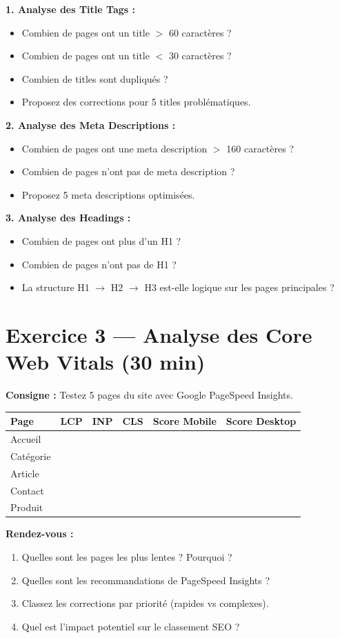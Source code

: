 \documentclass[12pt,a4paper]{report}
\begin{document}
\textbf{1. Analyse des Title Tags :}
\begin{itemize}
\item Combien de pages ont un title $>$ 60 caractères ?
\item Combien de pages ont un title $<$ 30 caractères ?
\item Combien de titles sont dupliqués ?
\item Proposez des corrections pour 5 titles problématiques.
\end{itemize}

\textbf{2. Analyse des Meta Descriptions :}
\begin{itemize}
\item Combien de pages ont une meta description $>$ 160 caractères ?
\item Combien de pages n'ont pas de meta description ?
\item Proposez 5 meta descriptions optimisées.
\end{itemize}

\textbf{3. Analyse des Headings :}
\begin{itemize}
\item Combien de pages ont plus d'un H1 ?
\item Combien de pages n'ont pas de H1 ?
\item La structure H1 $\rightarrow$ H2 $\rightarrow$ H3 est-elle logique sur les pages principales ?
\end{itemize}

\section{Exercice 3 --- Analyse des Core Web Vitals (30 min)}

\textbf{Consigne :} Testez 5 pages du site avec Google PageSpeed Insights.

\begin{tabular}{|l|c|c|c|c|c|}
\hline
\textbf{Page} & \textbf{LCP} & \textbf{INP} & \textbf{CLS} & \textbf{Score Mobile} & \textbf{Score Desktop} \\
\hline
Accueil & & & & & \\
\hline
Catégorie & & & & & \\
\hline
Article & & & & & \\
\hline
Contact & & & & & \\
\hline
Produit & & & & & \\
\hline
\end{tabular}

\textbf{Rendez-vous :}
\begin{enumerate}
\item Quelles sont les pages les plus lentes ? Pourquoi ?
\item Quelles sont les recommandations de PageSpeed Insights ?
\item Classez les corrections par priorité (rapides vs complexes).
\item Quel est l'impact potentiel sur le classement SEO ?
\end{enumerate}
\end{document}
